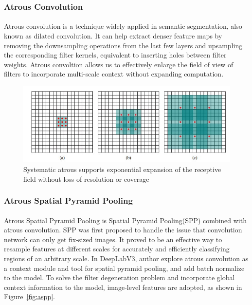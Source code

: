 \subsubsection{Atrous Convolution}
\paragraph{}
Atrous convolution is a technique widely applied in semantic segmentation, also known as dilated convolution. It can help extract denser feature maps by removing the downsampling operations from the last few layers and upsampling the corresponding filter kernels, equivalent to inserting holes between filter weights. Atrous convoltion allows us to effectively enlarge the field of view of filters to incorporate multi-scale context\cite{dilatedcon} without expanding computation.

\begin{figure}
    \centering
    \includegraphics{Section3/dilated convolution.jpg}
    \caption{Systematic atrous supports exponential expansion of the receptive field without loss of resolution or coverage}
    \label{fig:dilated}
\end{figure}

\subsubsection{Atrous Spatial Pyramid Pooling}
\paragraph{}
Atrous Spatial Pyramid Pooling is Spatial Pyramid Pooling(SPP) combined with atrous convolution. SPP was first proposed to handle the issue that convolution network can only get fix-sized images\cite{spp}. It proved to be an effective way to resample features at different scales for accurately and efficiently classifying regions of an arbitrary scale. In DeepLabV3, author explore atrous convolution as a context module and tool for spatial pyramid pooling, and add batch normalize to the model. To solve the filter degeneration problem and incorporate global context information to the model, image-level features are adopted, as shown in Figure~\ref{fig:aspp}.

